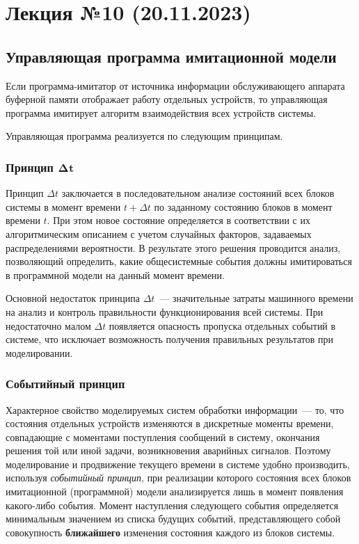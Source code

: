 \section{Лекция №10 (20.11.2023)}

\subsection{Управляющая программа имитационной модели}

Если программа-имитатор от источника информации обслуживающего аппарата буферной памяти отображает работу отдельных устройств, то управляющая программа имитирует алгоритм взаимодействия всех устройств системы.

Управляющая программа реализуется по следующим принципам.

\subsubsection{Принцип $\mathbf{\Delta t}$}

Принцип $\Delta t$ заключается в последовательном анализе состояний всех блоков системы в момент времени ${t + \Delta t}$ по заданному состоянию блоков в момент времени $t$. При этом новое состояние определяется в соответствии с их алгоритмическим описанием с учетом случайных факторов, задаваемых распределениями вероятности. В результате этого решения проводится анализ, позволяющий определить, какие общесистемные события должны имитироваться в программной модели на данный момент времени.

Основной недостаток принципа $\Delta t$~--- значительные затраты машинного времени на анализ и контроль правильности функционирования всей системы. При недостаточно малом $\Delta t$ появляется опасность пропуска отдельных событий в системе, что исключает возможность получения правильных результатов при моделировании.

\subsubsection{Событийный принцип}

Характерное свойство моделируемых систем обработки информации~--- то, что состояния отдельных устройств изменяются в дискретные моменты времени, совпадающие с моментами поступления сообщений в систему, окончания решения той или иной задачи, возникновения аварийных сигналов. Поэтому моделирование и
продвижение текущего времени в системе удобно производить, используя \textit{событийный принцип}, при реализации которого состояния всех блоков имитационной (программной) модели анализируется лишь в момент появления какого-либо события. Момент наступления следующего события определяется минимальным значением из списка будущих событий, представляющего собой совокупность \textbf{ближайшего} изменения состояния каждого из блоков системы.

